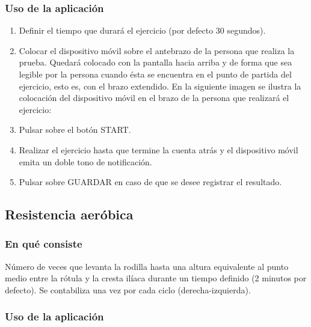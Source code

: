 \subsubsection{Uso de la aplicación}

\begin{enumerate}
\item Definir el tiempo que durará el ejercicio (por defecto 30 segundos). 
\item Colocar el dispositivo móvil sobre el antebrazo de la persona que realiza la prueba. Quedará colocado con la pantalla hacia arriba y de forma que sea legible por la persona cuando ésta se encuentra en el punto de partida del ejercicio, esto es, con el brazo extendido. En la siguiente imagen se ilustra la colocación del dispositivo móvil en el brazo de la persona que realizará el ejercicio:


\item Pulsar sobre el botón START.
\item Realizar el ejercicio hasta que termine la cuenta atrás y el dispositivo móvil emita un doble tono de notificación.
\item Pulsar sobre GUARDAR en caso de que se desee registrar el resultado.
\end{enumerate}

\subsection{Resistencia aeróbica}

\subsubsection{En qué consiste}

Número de veces que levanta la rodilla hasta una altura equivalente al punto medio entre la rótula y la cresta ilíaca durante un tiempo definido (2 minutos por defecto). Se contabiliza una vez por cada ciclo (derecha-izquierda).

\subsubsection{Uso de la aplicación}

